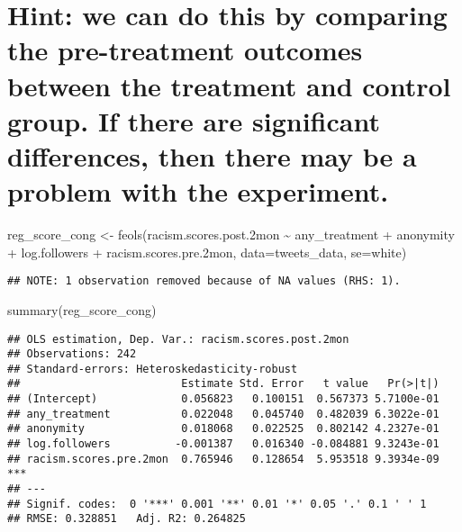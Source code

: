 \documentclass[
]{article}
\newenvironment{Shaded}{\begin{snugshade}}{\end{snugshade}}
\newcommand{\AttributeTok}[1]{\textcolor[rgb]{0.77,0.63,0.00}{#1}}
\newcommand{\FloatTok}[1]{\textcolor[rgb]{0.00,0.00,0.81}{#1}}
\newcommand{\FunctionTok}[1]{\textcolor[rgb]{0.00,0.00,0.00}{#1}}
\newcommand{\NormalTok}[1]{#1}
\newcommand{\OtherTok}[1]{\textcolor[rgb]{0.56,0.35,0.01}{#1}}
\newcommand{\SpecialCharTok}[1]{\textcolor[rgb]{0.00,0.00,0.00}{#1}}
\newcommand{\StringTok}[1]{\textcolor[rgb]{0.31,0.60,0.02}{#1}}
\begin{document}
\hypertarget{hint-we-can-do-this-by-comparing-the-pre-treatment-outcomes-between-the-treatment-and-control-group.-if-there-are-significant-differences-then-there-may-be-a-problem-with-the-experiment.}{%
\section{Hint: we can do this by comparing the pre-treatment outcomes
between the treatment and control group. If there are significant
differences, then there may be a problem with the
experiment.}\label{hint-we-can-do-this-by-comparing-the-pre-treatment-outcomes-between-the-treatment-and-control-group.-if-there-are-significant-differences-then-there-may-be-a-problem-with-the-experiment.}}

\begin{Shaded}
\begin{Highlighting}[]
\NormalTok{reg\_score\_cong }\OtherTok{\textless{}{-}} \FunctionTok{feols}\NormalTok{(racism.scores.post}\FloatTok{.2}\NormalTok{mon }\SpecialCharTok{\textasciitilde{}}\NormalTok{ any\_treatment }\SpecialCharTok{+}\NormalTok{ anonymity }\SpecialCharTok{+}\NormalTok{ log.followers }\SpecialCharTok{+}\NormalTok{ racism.scores.pre}\FloatTok{.2}\NormalTok{mon, }\AttributeTok{data=}\NormalTok{tweets\_data, }\AttributeTok{se=}\StringTok{\textquotesingle{}white\textquotesingle{}}\NormalTok{)}
\end{Highlighting}
\end{Shaded}

\begin{verbatim}
## NOTE: 1 observation removed because of NA values (RHS: 1).
\end{verbatim}

\begin{Shaded}
\begin{Highlighting}[]
\FunctionTok{summary}\NormalTok{(reg\_score\_cong)}
\end{Highlighting}
\end{Shaded}

\begin{verbatim}
## OLS estimation, Dep. Var.: racism.scores.post.2mon
## Observations: 242 
## Standard-errors: Heteroskedasticity-robust 
##                         Estimate Std. Error   t value   Pr(>|t|)    
## (Intercept)             0.056823   0.100151  0.567373 5.7100e-01    
## any_treatment           0.022048   0.045740  0.482039 6.3022e-01    
## anonymity               0.018068   0.022525  0.802142 4.2327e-01    
## log.followers          -0.001387   0.016340 -0.084881 9.3243e-01    
## racism.scores.pre.2mon  0.765946   0.128654  5.953518 9.3934e-09 ***
## ---
## Signif. codes:  0 '***' 0.001 '**' 0.01 '*' 0.05 '.' 0.1 ' ' 1
## RMSE: 0.328851   Adj. R2: 0.264825
\end{verbatim}
\end{document}
